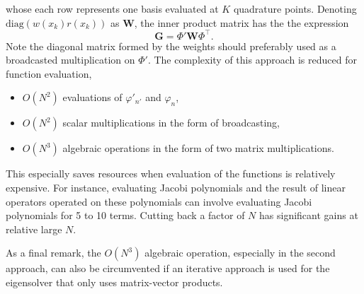 whose each row represents one basis evaluated at $K$ quadrature points. Denoting $\mathrm{diag}\left(w(x_k) r(x_k)\right)$ as $\mathbf{W}$, the inner product matrix has the the expression
\begin{equation}
    \mathbf{G} = \Phi' \mathbf{W} \Phi^\intercal.
\end{equation}
Note the diagonal matrix formed by the weights should preferably used as a broadcasted multiplication on $\Phi'$. The complexity of this approach is reduced for function evaluation,
\begin{itemize}
    \item $O(N^2)$ evaluations of $\varphi'_{n'}$ and $\varphi_n$,
    \item $O(N^2)$ scalar multiplications in the form of broadcasting,
    \item $O(N^3)$ algebraic operations in the form of two matrix multiplications.
\end{itemize}
This especially saves resources when evaluation of the functions is relatively expensive. For instance, evaluating Jacobi polynomials and the result of linear operators operated on these polynomials can involve evaluating Jacobi polynomials for 5 to 10 terms. Cutting back a factor of $N$ has significant gains at relative large $N$.

As a final remark, the $O(N^3)$ algebraic operation, especially in the second approach, can also be circumvented if an iterative approach is used for the eigensolver that only uses matrix-vector products.
